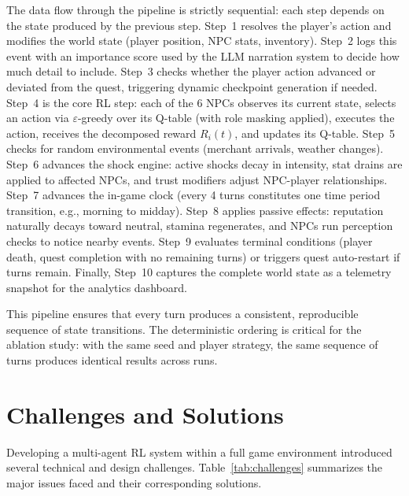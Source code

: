 \documentclass[12pt, a4paper, oneside]{report}
\begin{document}
The data flow through the pipeline is strictly sequential: each step depends on the state produced by the previous step. Step~1 resolves the player's action and modifies the world state (player position, NPC stats, inventory). Step~2 logs this event with an importance score used by the LLM narration system to decide how much detail to include. Step~3 checks whether the player action advanced or deviated from the quest, triggering dynamic checkpoint generation if needed. Step~4 is the core RL step: each of the 6 NPCs observes its current state, selects an action via $\varepsilon$-greedy over its Q-table (with role masking applied), executes the action, receives the decomposed reward $R_i(t)$, and updates its Q-table. Step~5 checks for random environmental events (merchant arrivals, weather changes). Step~6 advances the shock engine: active shocks decay in intensity, stat drains are applied to affected NPCs, and trust modifiers adjust NPC-player relationships. Step~7 advances the in-game clock (every 4 turns constitutes one time period transition, e.g., morning to midday). Step~8 applies passive effects: reputation naturally decays toward neutral, stamina regenerates, and NPCs run perception checks to notice nearby events. Step~9 evaluates terminal conditions (player death, quest completion with no remaining turns) or triggers quest auto-restart if turns remain. Finally, Step~10 captures the complete world state as a telemetry snapshot for the analytics dashboard.

This pipeline ensures that every turn produces a consistent, reproducible sequence of state transitions. The deterministic ordering is critical for the ablation study: with the same seed and player strategy, the same sequence of turns produces identical results across runs.

\chapter{Challenges and Solutions}
\label{chap:challenges}

Developing a multi-agent RL system within a full game environment introduced several technical and design challenges. Table~\ref{tab:challenges} summarizes the major issues faced and their corresponding solutions.
\end{document}
